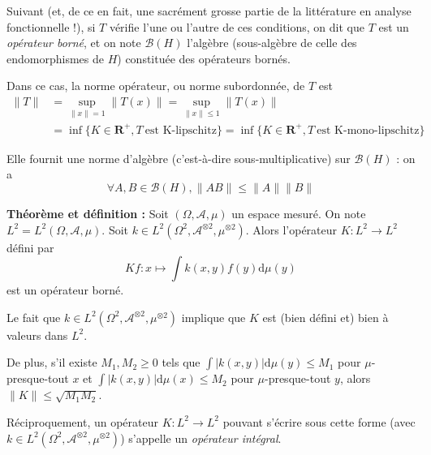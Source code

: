 \documentclass[12pt]{article}
\begin{document}
Suivant \cite{ConwayFunctAnalysis2019} (et, de ce en fait, une sacrément grosse partie de la littérature en analyse fonctionnelle !), si $T$ vérifie l'une ou l'autre de ces conditions, on dit que $T$ est un \textit{opérateur borné}, et on note $ \mathcal B(H) $ l'algèbre (sous-algèbre de celle des endomorphismes de $H$) constituée des opérateurs bornés.

Dans ce cas, la norme opérateur, ou norme subordonnée, de $T$ est \begin{align*} \|T\| &= \sup_{\|x\| = 1} \|T(x)\| = \sup_{\|x\| \leqslant 1} \|T(x)\| \\ &=  \inf \{K\in \mathbf R^+, T \: \text{est K-lipschitz} \} = \inf \{K\in \mathbf R^+, T \: \text{est K-mono-lipschitz} \} \end{align*}

Elle fournit une norme d'algèbre (c'est-à-dire sous-multiplicative) sur $ \mathcal B(H)$ : on a $$ \forall A, B \in \mathcal B(H), \|AB\| \leqslant \|A\| \|B\| $$


\textbf{Théorème et définition :} Soit $(\Omega, \mathcal A, \mu)$ un espace mesuré. On note $ L^2 = L^2(\Omega, \mathcal A, \mu)$. Soit $ k \in L^2(\Omega^2, \mathcal A^{\otimes 2}, \mu^{\otimes 2})$. Alors l'opérateur $ K : L^2 \to L^2 $ défini par $$ Kf : x \mapsto \int k(x,y)f(y) \mathrm d \mu (y) $$ est un opérateur borné. 

Le fait que $ k \in L^2(\Omega^2, \mathcal A^{\otimes 2}, \mu^{\otimes 2})$ implique que $K$ est (bien défini et) bien à valeurs dans $L^2$.

De plus, s'il existe $ M_1, M_2 \geqslant 0 $ tels que $ \displaystyle \int |k(x,y)| \mathrm d \mu(y) \leqslant M_1 $ pour $\mu$-presque-tout $x$ et $ \displaystyle \int |k(x,y)| \mathrm d \mu(x) \leqslant M_2 $ pour $\mu$-presque-tout $y$, alors $\|K\| \leqslant \sqrt{M_1M_2}$.

Réciproquement, un opérateur $ K : L^2 \to L^2 $ pouvant s'écrire sous cette forme (avec $ k \in L^2(\Omega^2, \mathcal A^{\otimes 2}, \mu^{\otimes 2})$) s'appelle un \textit{opérateur intégral}. 
\end{document}
